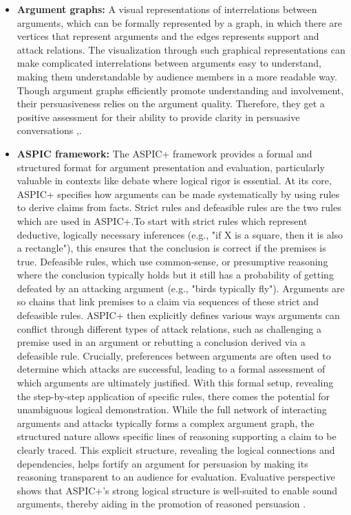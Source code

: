 \documentclass[conference]{IEEEtran}
\begin{document}
\begin{itemize}
\item \textbf{Argument graphs:} 
    A visual representations of interrelations between arguments, which can be formally represented by a graph, in which there are vertices that represent arguments and the edges represents support and attack relations. The visualization through such graphical representations can make complicated interrelations between arguments easy to understand, making them understandable by audience members in a more readable way. Though argument graphs efficiently promote understanding and involvement, their persuasiveness relies on the argument quality. Therefore, they get a positive assessment for their ability to provide clarity in persuasive conversations \cite{chalaguine2020persuasive},\cite{engelmann2022argumentation}.

    \item \textbf{ASPIC framework:} 
    The ASPIC+ framework provides a formal and structured format for argument presentation and evaluation, particularly valuable in contexts like debate where logical rigor is essential. At its core, ASPIC+ specifies how arguments can be made systematically by using rules to derive claims from facts. Strict rules and defeasible rules are the two rules which are used in ASPIC+.To start with strict rules which represent deductive, logically necessary inferences (e.g., "if X is a square, then it is also a rectangle"), this ensures that the conclusion is correct if the premises is true. Defeasible rules, which use common-sense, or presumptive reasoning where the conclusion typically holds but it still has a probability of getting defeated by an attacking argument (e.g., "birds typically fly"). Arguments are so chains that link premises to a claim via sequences of these strict and defeasible rules. ASPIC+ then explicitly defines various ways arguments can conflict through different types of attack relations, such as challenging a premise used in an argument or rebutting a conclusion derived via a defeasible rule. Crucially, preferences between arguments are often used to determine which attacks are successful, leading to a formal assessment of which arguments are ultimately justified. With this formal setup, revealing the step-by-step application of specific rules, there comes the potential for unambiguous logical demonstration. While the full network of interacting arguments and attacks typically forms a complex argument graph, the structured nature allows specific lines of reasoning supporting a claim to be clearly traced. This explicit structure, revealing the logical connections and dependencies, helps fortify an argument for persuasion by making its reasoning transparent to an audience for evaluation. Evaluative perspective shows that ASPIC+'s strong logical structure is well-suited to enable sound arguments, thereby aiding in the promotion of reasoned persuasion \cite{engelmann2022argumentation}.


\end{itemize}
\end{document}
